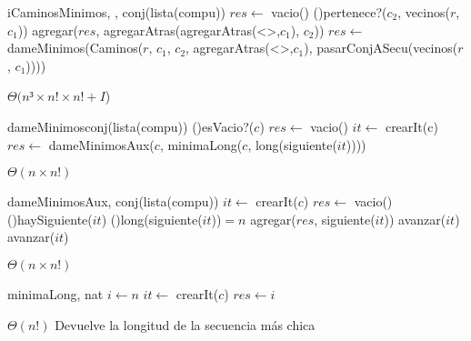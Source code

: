 \begin{Algoritmos}
  \begin{algoritmo}{iCaminosMinimos}{, , }{conj(lista(compu))}{}
    $res \gets$ vacio()
    \eIf(){pertenece?($c_{2}$, vecinos($r$, $c_{1}$))}{
      agregar($res$, agregarAtras(agregarAtras(<>,$c_{1}$), $c_{2}$))
    }{
      $res \gets$ dameMinimos(Caminos($r$, $c_{1}$, $c_{2}$, agregarAtras(<>,$c_{1}$), pasarConjASecu(vecinos($r$, $c_{1}$))))
    }
  \end{algoritmo}
  \datosAlgoritmo{} %
  {} %
  {} %
  {$\Theta(n³ \times n! \times n! + I$)} %
  {} %

  \begin{algoritmo}{dameMinimos}{}{conj(lista(compu))}
    \eIf(){esVacio?($c$)}{
      $res \gets$ vacio()
    }{
       $it \gets$ crearIt(c)
      $res \gets$ dameMinimosAux($c$, minimaLong($c$, long(siguiente($it$))))
    }
  \end{algoritmo}
  {} %
  {} %
  {$\Theta(n \times n!)$} %
  {} %

  \begin{algoritmo}{dameMinimosAux}{, }{conj(lista(compu))}
     $it \gets$ crearIt($c$)
    $res \gets$ vacio() 
    \While(){haySiguiente($it$)}{
      \eIf(){long(siguiente($it$))$=n$}{
        agregar($res$, siguiente($it$))
        avanzar($it$) 
      }{
        avanzar($it$) 
      }
    }
  \end{algoritmo}
  \datosAlgoritmo{} %
  {} %
  {} %
  {$\Theta(n \times n!)$} %
  {} %

  \begin{algoritmo}{minimaLong}{, }{nat}
     $i \gets n$
     $it \gets$ crearIt($c$)
    $res \gets i$
  \end{algoritmo}
  \datosAlgoritmo{} %
  {} %
  {} %
  {$\Theta(n!)$} %
  {Devuelve la longitud de la secuencia m\'{a}s chica} %
    

\end{Algoritmos}
